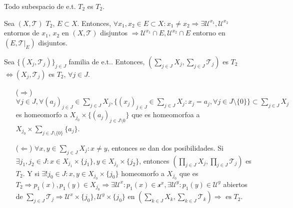\begin{prop}
  Todo subespacio de e.t. $T_{2}$ es $T_{2}$.
\end{prop}

\begin{dem}
  Sea $( X, \mathcal{T} )$ $T_{2}$, $E \subset X$. Entonces, $\forall x_{1}, x_{2} \in E \subset X : x_{1} \neq x_{2} \Rightarrow \exists \mathcal{U}^{x_{1}}, \mathcal{U}^{x_{2}}$ entornos de $x_{1}$, $x_{2}$ en $( X, \mathcal{T} )$ disjuntos $\Rightarrow \mathcal{U}^{x_{1}} \cap E, \mathcal{U}^{x_{2}} \cap E$ entorno en $(E, \mathcal{T}|_{E})$ disjuntos.
\end{dem}

\begin{prop}
  Sea $\{ ( X_{j}, \mathcal{T}_{j} ) \}_{j \in J}$ familia de e.t.. Entonces, $( \sum_{j \in J} X_{j}, \sum_{j \in J} \mathcal{T}_{j} )$ es $T_{2}$ $\Leftrightarrow ( X_{j}, \mathcal{T}_{j} )$ es $ T_{2}$, $\forall j \in J$.
\end{prop}

\begin{dem}
  \begin{enumerate}[label=(\roman*)]
    \item [($\Rightarrow$)] $\forall j \in J, \forall ( a_{j} )_{j \in J} \in \sum_{j \in J} X_{j}, \{ (x_{j})_{j \in J} \in \sum_{j \in J} X_{j} : x_{j} = a_{j}, \forall j \in J \setminus \{ 0 \} \} \subset \sum_{j \in J} X_{j}$ es homeomorfo a $X_{j_{0}} \times \{ ( a_{j} )_{j \in J \setminus {0}} \}$ que es homeomorfoa a $X_{j_{0}} \times \sum_{j \in J \setminus \{ 0 \}} \{ a_{j} \}$.
    \item [($\Leftarrow$)] $\forall x, y \in \sum_{ j \in J } X_{j}: x \neq y$, entonces se dan dos posibilidades. Si $ \exists j_{1}, j_{2} \in J : x \in X_{j_{1}} \times \{ j_{1} \}, y \in X_{j_{2}} \times \{ j_{2} \}$, entonces $( \prod_{j \in J} X_{j}, \prod_{j \in J} \mathcal{T}_{j} )$ es $T_{2}$. Y si $\exists ! j_{0}  \in J: x, y \in X_{j_{0}} \times \{ j_{0} \}$ homeomorfo a $X_{j_{0}}$ que es $T_{2} \Rightarrow p_{1}(x), p_{1}(y) \in X_{j_{0}} \Rightarrow \exists \mathcal{U}^{x}: p_{1}(x)\in \mathcal{x}^{x}, \exists \mathcal{U}^{y}: p_{1}(y) \in \mathcal{U}^{y} $ abiertos de $\sum_{j \in J} \mathcal{T}_{j} \Rightarrow \mathcal{U}^{x} \times \{ j_{0} \}, \mathcal{U}^{y} \times \{ j_{0} \}$ en $( \sum_{k \in J} X_{k}, \sum_{k \in J} \mathcal{T}_{k}) \Rightarrow \text{ es } T_{2}$.
  \end{enumerate}
\end{dem}

